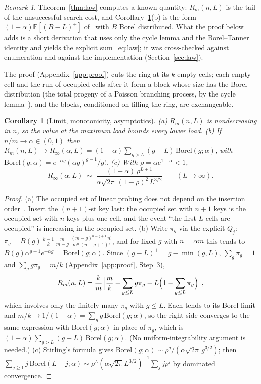 \documentclass[11pt,a4paper]{article}
\newtheorem{corollary}[theorem]{Corollary}
\theoremstyle{definition}
\theoremstyle{remark}
\newtheorem{remark}{Remark}
\newcommand{\E}{\mathbb{E}}
\begin{document}
\begin{remark}\label{rem:classical}
Theorem~\ref{thm:law} computes a known quantity: $R_m(n,L)$ is the tail of the unsuccessful-search cost, and Corollary~\ref{cor:limit}(b) is the form $(1-\alpha)\E[(B-L)^+]$ of~\cite[Eq.~(11.4)]{janson2016} with $B$ Borel distributed. What the proof below adds is a short derivation that uses only the cycle lemma and the Borel--Tanner identity and yields the explicit sum~\eqref{eq:law}; it was cross-checked against enumeration and against the implementation (Section~\ref{sec:law}).
\end{remark}

The proof (Appendix~\ref{app:proof}) cuts the ring at its $k$ empty cells; each empty cell and the run of occupied cells after it form a block whose size has the Borel distribution (the total progeny of a Poisson branching process, by the cycle lemma~\cite{dwass1969}), and the blocks, conditioned on filling the ring, are exchangeable.

\begin{corollary}[Limit, monotonicity, asymptotics]\label{cor:limit}
(a) $R_m(n,L)$ is nondecreasing in $n$, so the value at the maximum load bounds every lower load. (b) If $n/m\to\alpha\in(0,1)$ then $R_m(n,L)\to R_\infty(\alpha,L)=(1-\alpha)\sum_{g>L}(g-L)\,\mathrm{Borel}(g;\alpha)$, with $\mathrm{Borel}(g;\alpha)=e^{-\alpha g}(\alpha g)^{g-1}/g!$. (c) With $\rho=\alpha e^{1-\alpha}<1$,
\[
R_\infty(\alpha,L)\;\sim\;\frac{(1-\alpha)\,\rho^{L+1}}{\alpha\sqrt{2\pi}\,(1-\rho)^{2}\,L^{3/2}}\qquad(L\to\infty).
\]
\end{corollary}
\begin{proof}
(a) The occupied set of linear probing does not depend on the insertion order~\cite{konheim1966}. Insert the $(n+1)$-st key last: the occupied set with $n+1$ keys is the occupied set with $n$ keys plus one cell, and the event ``the first $L$ cells are occupied'' is increasing in the occupied set. (b) Write $\pi_g$ via the explicit $Q_j$: $\pi_g=B(g)\,\frac{k-1}{k}\,\frac{m}{m-g}\,\frac{(m-g)^{n-g+1}\,n!}{m^{n}\,(n-g+1)!}$, and for fixed $g$ with $n=\alpha m$ this tends to $B(g)\alpha^{g-1}e^{-\alpha g}=\mathrm{Borel}(g;\alpha)$. Since $(g-L)^+=g-\min(g,L)$, $\sum_g\pi_g=1$ and $\sum_g g\pi_g=m/k$ (Appendix~\ref{app:proof}, Step~3),
\[
R_m(n,L)=\frac km\Bigl[\frac mk-\sum_{g\le L}g\pi_g-L\Bigl(1-\sum_{g\le L}\pi_g\Bigr)\Bigr],
\]
which involves only the finitely many $\pi_g$ with $g\le L$. Each tends to its Borel limit and $m/k\to1/(1-\alpha)=\sum_g g\,\mathrm{Borel}(g;\alpha)$, so the right side converges to the same expression with $\mathrm{Borel}(g;\alpha)$ in place of $\pi_g$, which is $(1-\alpha)\sum_{g>L}(g-L)\,\mathrm{Borel}(g;\alpha)$. (No uniform-integrability argument is needed.) (c) Stirling's formula gives $\mathrm{Borel}(g;\alpha)\sim\rho^g/(\alpha\sqrt{2\pi}\,g^{3/2})$; then $\sum_{j\ge1}j\,\mathrm{Borel}(L+j;\alpha)\sim \rho^L(\alpha\sqrt{2\pi}L^{3/2})^{-1}\sum_j j\rho^j$ by dominated convergence.
\end{proof}
\end{document}
